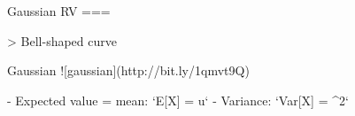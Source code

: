 Gaussian RV
===

> Bell-shaped curve

Gaussian ![gaussian](http://bit.ly/1qmvt9Q)

- Expected value = mean: `E[X] = u`
- Variance: `Var[X] = \sigma^2`
